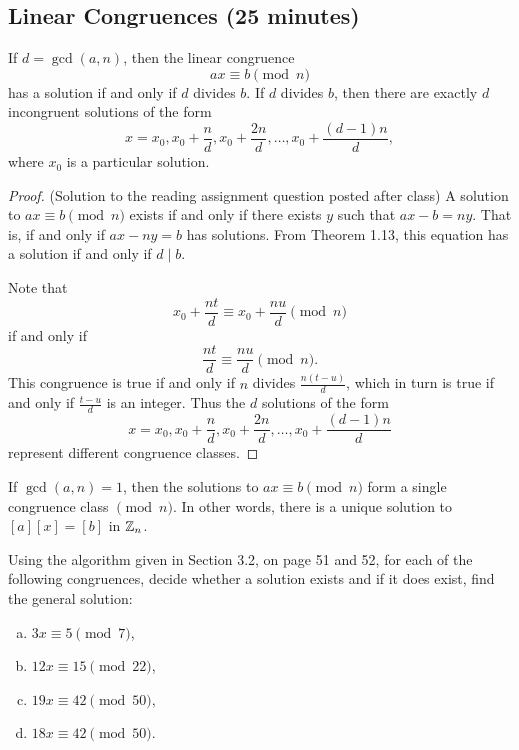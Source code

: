 \documentclass[letterpaper, 11 pt]{article}
\begin{document}
\subsection{Linear Congruences (25 minutes)}
\begin{thm}[Theorem 3.7]
 If $d=\gcd(a,n)$, then the linear congruence \[ax\equiv b \pmod n\] has a solution if and only if $d$ divides $b$. If $d$ divides $b$, then there are exactly $d$ incongruent solutions of the form \[x=x_0,x_0+\frac{n}{d},x_0+\frac{2n}{d},\dots,x_0+\frac{(d-1)n}{d},\] where $x_0$ is a particular solution.
\end{thm}
\begin{proof}
(Solution to the reading assignment question posted after class)
A solution to $ax\equiv b \pmod n$ exists if and only if there exists $y$ such that $ax-b=ny$. That is, if and only if $ax-ny=b$ has solutions. From Theorem 1.13, this equation has a solution if and only if $d\mid b$.

Note that \[x_0+\frac{nt}{d}\equiv x_0+\frac{nu}{d}\pmod n\] if and only if  \[\frac{nt}{d}\equiv \frac{nu}{d}\pmod n.\] This congruence is true if and only if $n$ divides $\frac{n(t-u)}{d}$, which in turn is true if and only if $\frac{t-u}{d}$ is an integer. Thus the $d$ solutions of the form \[x=x_0,x_0+\frac{n}{d},x_0+\frac{2n}{d},\dots,x_0+\frac{(d-1)n}{d}\] represent different congruence classes. 
\end{proof}

\begin{cor}[Corollary 3.8]
 If $\gcd(a,n)=1$, then the solutions to $ax\equiv b \pmod n$ form a single congruence class $\pmod n$. In other words, there is a unique solution to $[a][x]=[b]$ in $\mathbb Z_n$.
\end{cor}

\begin{br} Using the algorithm given in Section 3.2, on page 51 and 52, for each of the following congruences, decide whether a solution exists and if it does exist, find the general solution:
\begin{enumerate}[(a)]
 \item $3x \equiv 5 \pmod 7$,
 \item $12x\equiv 15 \pmod{22}$,
 \item $19x\equiv 42 \pmod{50}$,
 \item $18x\equiv 42 \pmod{50}$.
\end{enumerate}
\end{br}
\end{document}
